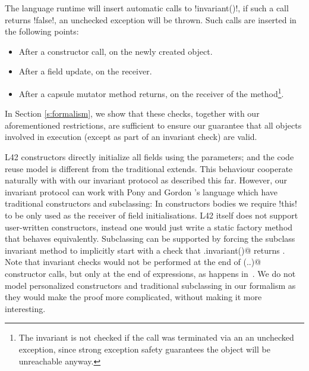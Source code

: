 



The language runtime will insert automatic calls to \Q!invariant()!, if such a call returns \Q!false!, an unchecked exception will be thrown. Such calls are inserted in the following points:
\begin{itemize}
	\item After a constructor call, on the newly created object.
	\item After a field update, on the receiver.
	\item After a capsule mutator method returns, on the receiver of the method\footnote{The invariant is not checked if the call was terminated via an an unchecked exception, since strong exception safety guarantees the object will be unreachable anyway.}.
\end{itemize}
\noindent In Section \ref{s:formalism}, we show that these checks, together with our aforementioned restrictions, are sufficient to ensure our guarantee that all objects involved in execution (except as part of an invariant check) are valid.

L42 constructors directly initialize all fields using the parameters; and the code reuse model is different from the traditional extends.
This behaviour cooperate naturally with with our invariant protocol as described this far.
However, our invariant protocol can work with Pony and Gordon \etal's language which have traditional constructors and subclassing:
In constructors bodies we require \Q!this! to be only used as the receiver of field initialisations. L42 itself does not support user-written constructors, instead one would just write a static factory method that behaves equivalently.
Subclassing can be supported by forcing the subclass invariant method to implicitly start with a check that \Q@super.invariant()@ returns \Q@true@. Note that invariant checks would not be performed at the end of \Q@super(..)@ constructor calls, but only at the end of \Q@new@ expressions, as happens in~\cite{feldman2006jose}.
We do not model personalized constructors and traditional subclassing in our formalism as they would make the proof more complicated, without making it more interesting.